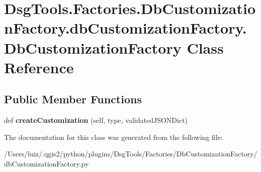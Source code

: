 \hypertarget{class_dsg_tools_1_1_factories_1_1_db_customization_factory_1_1db_customization_factory_1_1_db_customization_factory}{}\section{Dsg\+Tools.\+Factories.\+Db\+Customization\+Factory.\+db\+Customization\+Factory.\+Db\+Customization\+Factory Class Reference}
\label{class_dsg_tools_1_1_factories_1_1_db_customization_factory_1_1db_customization_factory_1_1_db_customization_factory}
\subsection*{Public Member Functions}
\begin{DoxyCompactItemize}
\item 
\mbox{\label{class_dsg_tools_1_1_factories_1_1_db_customization_factory_1_1db_customization_factory_1_1_db_customization_factory_a98522f3323a02d87c47631379d615fff}} 
def {\bfseries create\+Customization} (self, type, validated\+J\+S\+O\+N\+Dict)
\end{DoxyCompactItemize}


The documentation for this class was generated from the following file\+:\begin{DoxyCompactItemize}
\item 
/\+Users/luiz/.\+qgis2/python/plugins/\+Dsg\+Tools/\+Factories/\+Db\+Customization\+Factory/db\+Customization\+Factory.\+py\end{DoxyCompactItemize}
